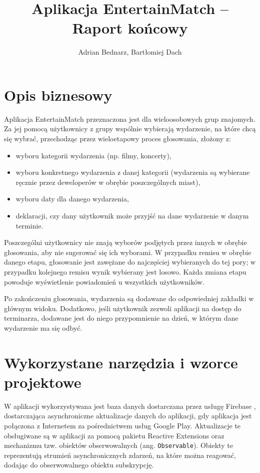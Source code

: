 \documentclass[10pt,a4paper]{article}
\title{Aplikacja EntertainMatch -- Raport końcowy}
\author{Adrian Bednarz, Bartłomiej Dach}
\begin{document}
\maketitle

\section{Opis biznesowy}

Aplikacja EntertainMatch przeznaczona jest dla wieloosobowych grup znajomych.
Za jej pomocą użytkownicy z grupy wspólnie wybierają wydarzenie, na które chcą się wybrać,
przechodząc przez wieloetapowy proces głosowania, złożony z:

\begin{itemize}
	\item wyboru kategorii wydarzenia (np. filmy, koncerty),
	\item wyboru konkretnego wydarzenia z danej kategorii (wydarzenia są wybierane ręcznie przez
		deweloperów w obrębie poszczególnych miast),
	\item wyboru daty dla danego wydarzenia,
	\item deklaracji, czy dany użytkownik może przyjść na dane wydarzenie w danym terminie.
\end{itemize}

Poszczególni użytkownicy nie znają wyborów podjętych przez innych w obrębie głosowania, aby nie
sugerować się ich wyborami.
W przypadku remisu w obrębie danego etapu, głosowanie jest zawężane do najczęściej wybieranych
do tej pory; w przypadku kolejnego remisu wynik wybierany jest losowo.
Każda zmiana etapu powoduje wyświetlenie powiadomień u wszystkich użytkowników.

Po zakończeniu głosowania, wydarzenia są dodawane do odpowiedniej zakładki w głównym widoku.
Dodatkowo, jeśli użytkownik zezwoli aplikacji na dostęp do terminarza, dodawane jest do niego
przypomnienie na dzień, w którym dane wydarzenie ma się odbyć.

\section{Wykorzystane narzędzia i wzorce projektowe}

W aplikacji wykorzystywana jest baza danych dostarczana przez usługę Firebase \cite{firebase},
dostarczająca asynchroniczne aktualizacje danych do aplikacji, gdy aplikacja jest połączona
z Internetem za pośrednictwem usług Google Play.
Aktualizacje te obsługiwane są w aplikacji za pomocą pakietu Reactive Extensions oraz mechanizmu
tzw. obiektów obserwowalnych (ang. \texttt{Observable}).
Obiekty te reprezentują strumień asynchronicznych zdarzeń, na które można reagować, dodając
do obserwowalnego obiektu subskrypcję.
\end{document}
